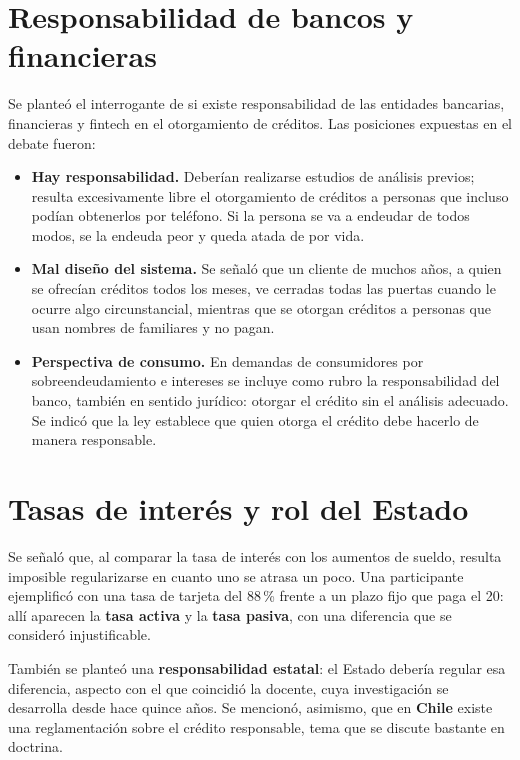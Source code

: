 \documentclass[12pt,oneside]{book}
\begin{document}
\section{Responsabilidad de bancos y financieras}

Se planteó el interrogante de si existe responsabilidad de las entidades bancarias, financieras y fintech en el otorgamiento de créditos. Las posiciones expuestas en el debate fueron:

\begin{itemize}
    \item \textbf{Hay responsabilidad.} Deberían realizarse estudios de análisis previos; resulta excesivamente libre el otorgamiento de créditos a personas que incluso podían obtenerlos por teléfono. Si la persona se va a endeudar de todos modos, se la endeuda peor y queda atada de por vida.
    \item \textbf{Mal diseño del sistema.} Se señaló que un cliente de muchos años, a quien se ofrecían créditos todos los meses, ve cerradas todas las puertas cuando le ocurre algo circunstancial, mientras que se otorgan créditos a personas que usan nombres de familiares y no pagan.
    \item \textbf{Perspectiva de consumo.} En demandas de consumidores por sobreendeudamiento e intereses se incluye como rubro la responsabilidad del banco, también en sentido jurídico: otorgar el crédito sin el análisis adecuado. Se indicó que la ley establece que quien otorga el crédito debe hacerlo de manera responsable.
\end{itemize}

\section{Tasas de interés y rol del Estado}

Se señaló que, al comparar la tasa de interés con los aumentos de sueldo, resulta imposible regularizarse en cuanto uno se atrasa un poco. Una participante ejemplificó con una tasa de tarjeta del 88\,\% frente a un plazo fijo que paga el 20: allí aparecen la \textbf{tasa activa} y la \textbf{tasa pasiva}, con una diferencia que se consideró injustificable.

También se planteó una \textbf{responsabilidad estatal}: el Estado debería regular esa diferencia, aspecto con el que coincidió la docente, cuya investigación se desarrolla desde hace quince años. Se mencionó, asimismo, que en \textbf{Chile} existe una reglamentación sobre el crédito responsable, tema que se discute bastante en doctrina.
\end{document}
